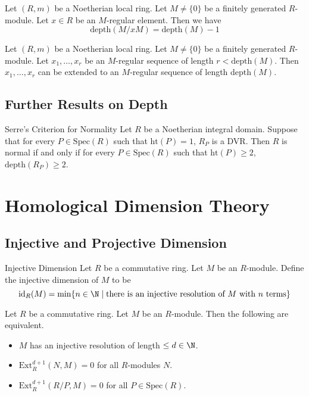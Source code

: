 \documentclass[a4paper]{article}
\begin{document}
\begin{lmm}{}{} Let $(R,m)$ be a Noetherian local ring. Let $M\neq\{0\}$ be a finitely generated $R$-module. Let $x\in R$ be an $M$-regular element. Then we have $$\text{depth}(M/xM)=\text{depth}(M)-1$$
\end{lmm}

\begin{crl}{}{} Let $(R,m)$ be a Noetherian local ring. Let $M\neq\{0\}$ be a finitely generated $R$-module. Let $x_1,\dots,x_r$ be an $M$-regular sequence of length $r<\text{depth}(M)$. Then $x_1,\dots,x_r$ can be extended to an $M$-regular sequence of length $\text{depth}(M)$. 
\end{crl}

\subsection{Further Results on Depth}
\begin{thm}{Serre's Criterion for Normality}{} Let $R$ be a Noetherian integral domain. Suppose that for every $P\in\text{Spec}(R)$ such that $\text{ht}(P)=1$, $R_P$ is a DVR. Then $R$ is normal if and only if for every $P\in\text{Spec}(R)$ such that $\text{ht}(P)\geq 2$, $\text{depth}(R_P)\geq 2$. 
\end{thm}

\pagebreak
\section{Homological Dimension Theory}
\subsection{Injective and Projective Dimension}
\begin{defn}{Injective Dimension}{} Let $R$ be a commutative ring. Let $M$ be an $R$-module. Define the injective dimension of $M$ to be $$\text{id}_R(M)=\min\{n\in\N\;|\;\text{there is an injective resolution of }M\text{ with }n\text{ terms}\}$$
\end{defn}

\begin{prp}{}{} Let $R$ be a commutative ring. Let $M$ be an $R$-module. Then the following are equivalent. 
\begin{itemize}
\item $M$ has an injective resolution of length $\leq d\in\N$. 
\item $\text{Ext}_R^{d+1}(N,M)=0$ for all $R$-modules $N$. 
\item $\text{Ext}_R^{d+1}(R/P,M)=0$ for all $P\in\text{Spec}(R)$. 
\end{itemize}
\end{prp}
\end{document}
